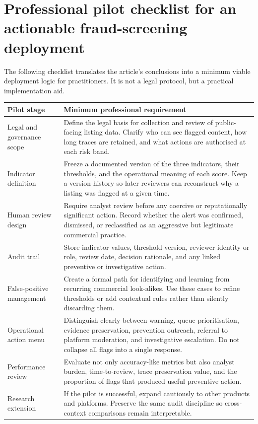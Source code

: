 \documentclass[11pt,a4paper]{article}
\begin{document}
\appendix
\section{Professional pilot checklist for an actionable fraud-screening deployment}
The following checklist translates the article's conclusions into a minimum viable deployment logic for practitioners. It is not a legal protocol, but a practical implementation aid.

\begin{longtable}{p{3.3cm} p{11.3cm}}
\toprule
\textbf{Pilot stage} & \textbf{Minimum professional requirement} \\
\midrule
Legal and governance scope & Define the legal basis for collection and review of public-facing listing data. Clarify who can see flagged content, how long traces are retained, and what actions are authorised at each risk band. \\
Indicator definition & Freeze a documented version of the three indicators, their thresholds, and the operational meaning of each score. Keep a version history so later reviewers can reconstruct why a listing was flagged at a given time. \\
Human review design & Require analyst review before any coercive or reputationally significant action. Record whether the alert was confirmed, dismissed, or reclassified as an aggressive but legitimate commercial practice. \\
Audit trail & Store indicator values, threshold version, reviewer identity or role, review date, decision rationale, and any linked preventive or investigative action. \\
False-positive management & Create a formal path for identifying and learning from recurring commercial look-alikes. Use these cases to refine thresholds or add contextual rules rather than silently discarding them. \\
Operational action menu & Distinguish clearly between warning, queue prioritisation, evidence preservation, prevention outreach, referral to platform moderation, and investigative escalation. Do not collapse all flags into a single response. \\
Performance review & Evaluate not only accuracy-like metrics but also analyst burden, time-to-review, trace preservation value, and the proportion of flags that produced useful preventive action. \\
Research extension & If the pilot is successful, expand cautiously to other products and platforms. Preserve the same audit discipline so cross-context comparisons remain interpretable. \\
\bottomrule
\end{longtable}
\end{document}
